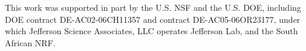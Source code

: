 \begin{acknowledgments}

This work was supported in part by the U.S. NSF and the U.S. DOE, including
DOE contract DE-AC02-06CH11357 and contract DE-AC05-06OR23177, under which
Jefferson Science Associates, LLC operates Jefferson Lab, and the South
African NRF.

\end{acknowledgments}


